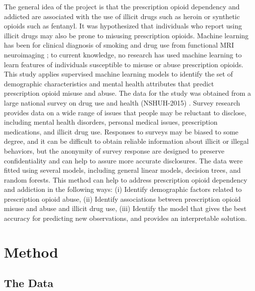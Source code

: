 \documentclass[sigconf]{acmart}
\begin{document}
The general idea of the project is that the prescription opioid dependency 
and addicted are associated with the use of illicit drugs such as heroin or 
synthetic opioids such as fentanyl. It was hypothesized that individuals who 
report using illicit drugs may also be prone to misusing prescription opioids. 
Machine learning has been for clinical diagnosis of smoking and drug use from 
functional MRI neuroimaging \cite{zhang05, pariyadath14}; to current
knowledge, no research has used machine learning to learn features of 
individuals susceptible to misuse or abuse prescription opioids. This study 
applies supervised machine learning models to identify the set of demographic 
characteristics and mental health attributes that predict prescription opioid 
misuse and abuse. The data for the study was obtained from a large national 
survey on drug use and health (NSHUH-2015) \cite{samhsa16}. Survey research 
provides data on a wide range of issues that people may be reluctant to 
disclose, including mental health disorders, personal medical issues, 
prescription medications, and illicit drug use. Responses to surveys may be 
biased to some degree, and it can be difficult to obtain reliable information 
about illicit or illegal behaviors, but the anonymity of survey response are 
designed to preserve confidentiality and can help to assure more accurate 
disclosures. The data were fitted using several models, including general 
linear models, decision trees, and random forests. This method can help to 
address prescription opioid dependency and addiction in the following ways: 
(i) Identify demographic factors related to prescription opioid abuse, (ii) 
Identify associations between prescription opioid misuse and abuse and 
illicit drug use, (iii) Identify the model that gives the best accuracy
for predicting new observations, and provides an interpretable solution. 





\section{Method}

\subsection{The Data}
\end{document}

